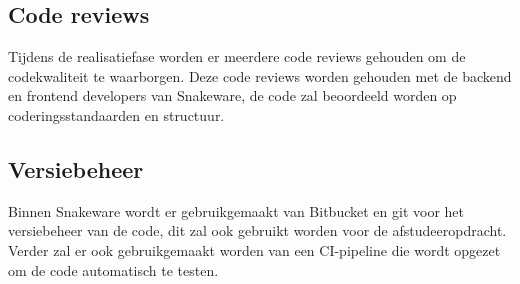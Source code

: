 \subsection{Code reviews}
Tijdens de realisatiefase worden er meerdere code reviews gehouden om de codekwaliteit te waarborgen.
Deze code reviews worden gehouden met de backend en frontend developers van Snakeware, de code zal beoordeeld worden op coderingsstandaarden en structuur.
\subsection{Versiebeheer}
Binnen Snakeware wordt er gebruikgemaakt van Bitbucket \Parencite{BitBucket} en git \Parencite{Git} voor het versiebeheer van de code, dit zal ook gebruikt worden voor de afstudeeropdracht.
Verder zal er ook gebruikgemaakt worden van een CI-pipeline die wordt opgezet om de code automatisch te testen.
